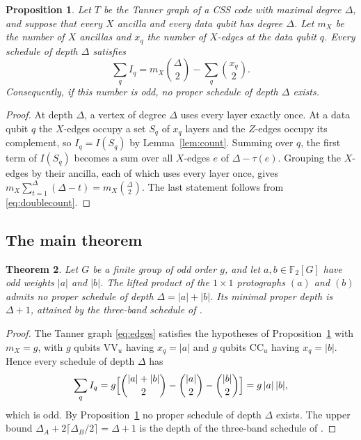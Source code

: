\documentclass[11pt,a4paper]{article}
\newtheorem{theorem}{Theorem}
\newtheorem{proposition}[theorem]{Proposition}
\theoremstyle{definition}
\theoremstyle{plain}
\newcommand{\F}{\mathbb{F}_2}
\newcommand{\VV}{\mathrm{VV}}
\newcommand{\CC}{\mathrm{CC}}
\begin{document}
\begin{proposition}\label{prop:general}
Let $T$ be the Tanner graph of a CSS code with maximal degree $\Delta$, and
suppose that every $X$ ancilla and every data qubit has degree $\Delta$. Let
$m_X$ be the number of $X$ ancillas and $x_q$ the number of $X$-edges at the
data qubit $q$. Every schedule of depth $\Delta$ satisfies
\[
\sum_qI_q=m_X\binom{\Delta}{2}-\sum_q\binom{x_q}{2}.
\]
Consequently, if this number is odd, no proper schedule of depth $\Delta$
exists.
\end{proposition}
\begin{proof}
At depth $\Delta$, a vertex of degree $\Delta$ uses every layer exactly once.
At a data qubit $q$ the $X$-edges occupy a set $S_q$ of $x_q$ layers and the
$Z$-edges occupy its complement, so $I_q=I(S_q)$ by Lemma~\ref{lem:count}.
Summing over $q$, the first term of $I(S_q)$ becomes a sum over all
$X$-edges $e$ of $\Delta-\tau(e)$. Grouping the $X$-edges by their ancilla,
each of which uses every layer once, gives
$m_X\sum_{t=1}^{\Delta}(\Delta-t)=m_X\binom{\Delta}{2}$. The last statement
follows from \eqref{eq:doublecount}.
\end{proof}

\subsection{The main theorem}
\begin{theorem}\label{thm:main}
Let $G$ be a finite group of odd order $g$, and let $a,b\in\F[G]$ have odd
weights $\lvert a\rvert$ and $\lvert b\rvert$. The lifted product of the
$1\times1$ protographs $(a)$ and $(b)$ admits no proper schedule of depth
$\Delta=\lvert a\rvert+\lvert b\rvert$. Its minimal proper depth is $\Delta+1$,
attained by the three-band schedule of \cite{NRB2026}.
\end{theorem}
\begin{proof}
The Tanner graph \eqref{eq:edges} satisfies the hypotheses of
Proposition~\ref{prop:general} with $m_X=g$, with $g$ qubits $\VV_u$ having
$x_q=\lvert a\rvert$ and $g$ qubits $\CC_u$ having $x_q=\lvert b\rvert$. Hence
every schedule of depth $\Delta$ has
\[
\sum_qI_q=g\Bigl[\binom{\lvert a\rvert+\lvert b\rvert}{2}-\binom{\lvert a\rvert}{2}-\binom{\lvert b\rvert}{2}\Bigr]
=g\,\lvert a\rvert\,\lvert b\rvert ,
\]
which is odd. By Proposition~\ref{prop:general} no proper schedule of depth
$\Delta$ exists. The upper bound $\Delta_A+2\lceil\Delta_B/2\rceil=\Delta+1$ is
the depth of the three-band schedule of \cite{NRB2026}.
\end{proof}
\end{document}
